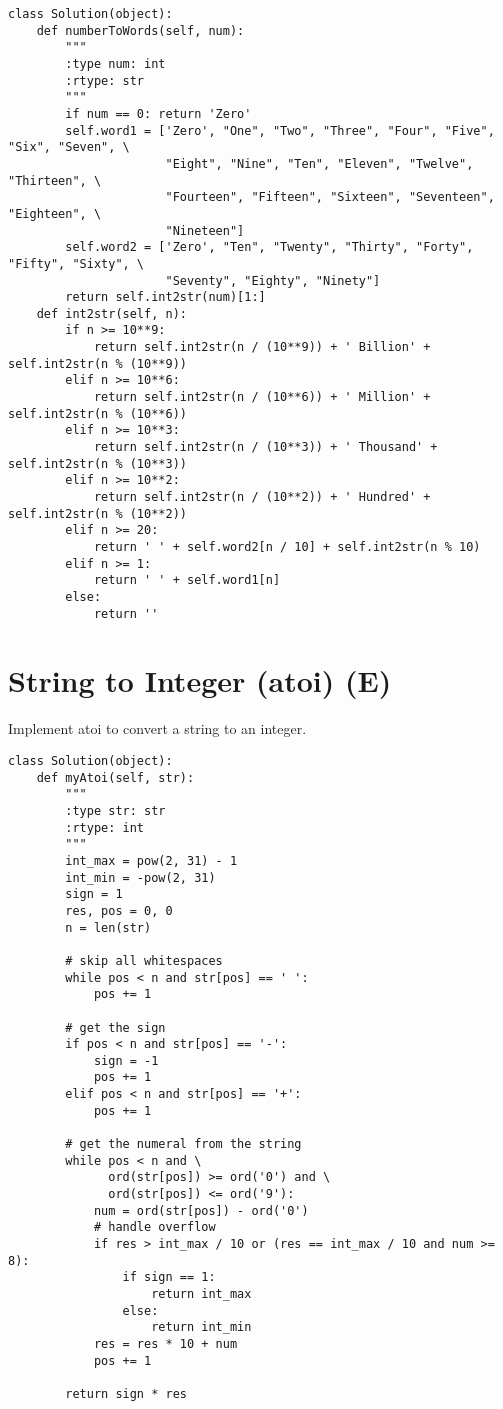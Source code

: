 \begin{lstlisting}
class Solution(object):
    def numberToWords(self, num):
        """
        :type num: int
        :rtype: str
        """
        if num == 0: return 'Zero'
        self.word1 = ['Zero', "One", "Two", "Three", "Four", "Five", "Six", "Seven", \
                      "Eight", "Nine", "Ten", "Eleven", "Twelve", "Thirteen", \
                      "Fourteen", "Fifteen", "Sixteen", "Seventeen", "Eighteen", \
                      "Nineteen"]
        self.word2 = ['Zero', "Ten", "Twenty", "Thirty", "Forty", "Fifty", "Sixty", \
                      "Seventy", "Eighty", "Ninety"]
        return self.int2str(num)[1:]
    def int2str(self, n):
        if n >= 10**9:
            return self.int2str(n / (10**9)) + ' Billion' + self.int2str(n % (10**9))
        elif n >= 10**6:
            return self.int2str(n / (10**6)) + ' Million' + self.int2str(n % (10**6))
        elif n >= 10**3:
            return self.int2str(n / (10**3)) + ' Thousand' + self.int2str(n % (10**3))
        elif n >= 10**2:
            return self.int2str(n / (10**2)) + ' Hundred' + self.int2str(n % (10**2))
        elif n >= 20:
            return ' ' + self.word2[n / 10] + self.int2str(n % 10)
        elif n >= 1:
            return ' ' + self.word1[n]
        else:
            return ''
\end{lstlisting}

\section{String to Integer (atoi) (E)}
Implement atoi to convert a string to an integer. \\

\begin{lstlisting}
class Solution(object):
    def myAtoi(self, str):
        """
        :type str: str
        :rtype: int
        """
        int_max = pow(2, 31) - 1
        int_min = -pow(2, 31)
        sign = 1
        res, pos = 0, 0
        n = len(str)
        
        # skip all whitespaces
        while pos < n and str[pos] == ' ':
            pos += 1
        
        # get the sign
        if pos < n and str[pos] == '-':
            sign = -1
            pos += 1
        elif pos < n and str[pos] == '+':
            pos += 1
            
        # get the numeral from the string
        while pos < n and \
              ord(str[pos]) >= ord('0') and \
              ord(str[pos]) <= ord('9'):
            num = ord(str[pos]) - ord('0')
            # handle overflow
            if res > int_max / 10 or (res == int_max / 10 and num >= 8): 
                if sign == 1:
                    return int_max
                else:
                    return int_min
            res = res * 10 + num
            pos += 1
        
        return sign * res
\end{lstlisting}

